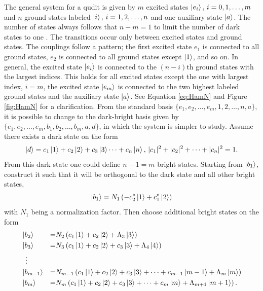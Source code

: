 The general system for a qudit is given by $m$ excited states $\ket{e_i},\,i = 0,1,\dots,m$ and $n$ ground states labeled $\ket{i},\,i = 1,2,\dots,n$ and one auxiliary state $\ket{a}$. The number of states always follows that $n-m = 1$ to limit the number of dark states to one \cite{lambda}.
The transitions occur only between excited states and ground states. The couplings follow a pattern; the first excited state $e_1$ is connected to all ground states, $e_2$ is connected to all ground states except $\ket{1}$, and so on. In general, the excited state $\ket{e_i}$ is connected to the $(n - i)$th ground states with the largest indices. This holds for all excited states except the one with largest index, $i = m$, the excited state $\ket{e_m}$ is connected to the two highest labeled ground states and the auxiliary state $\ket{a}$. See Equation \ref{eq:HamN} and Figure \ref{fig:HamN} for a clarification. 
From the standard basis $\{e_1,e_2,\dots,e_m,1,2,\dots,n,a\}$, it is possible to change to the dark-bright basis given by $\{e_1,e_2,\dots,e_m,b_1,b_2,\dots,b_{m},a,d\}$, in which the system is simpler to study. Assume there exists a dark state on the form 
\begin{equation}
\ket{d} = c_1\ket{1} + c_2\ket{2} + c_3\ket{3} \dots + c_{n}\ket{n},\, |c_1|^2 + |c_2|^2 + \dots + |c_{n}|^2 = 1.
\end{equation}
From this dark state one could define $n-1 = m$ bright states. Starting from $\ket{b_1}$, construct it such that it will be orthogonal to the dark state and all other bright states,
\begin{equation}
\ket{b_1} = N_1\left(-c_2^{*}\ket{1} + c_1^{*}\ket{2}\right)
\end{equation}
with $N_1$ being a normalization factor. Then choose additional bright states on the form
\begin{equation}
\label{eq:birght_states}
\begin{aligned}
&\ket{b_2} &=& N_2 \left(c_1\ket{1} + c_2\ket{2} + \Lambda_3\ket{3}  \right)
\\
&\ket{b_3} &=&  N_3 \left(c_1\ket{1} + c_2\ket{2} + c_3\ket{3} + \Lambda_{4}\ket{4} \right)
\\
&\;\;\vdots
\\
&\ket{b_{m-1}} &=& N_{m-1} \left( c_1\ket{1} + c_2\ket{2} + c_3\ket{3}  + \dots + c_{m-1}\ket{m-1}+ \Lambda_m\ket{m} \right)
\\
&\ket{b_{m}} &=& N_m \left( c_1\ket{1} + c_2\ket{2} + c_3\ket{3}  + \dots + c_m\ket{m} + \Lambda_{m+1}\ket{m+1} \right).
\end{aligned}
\end{equation}
